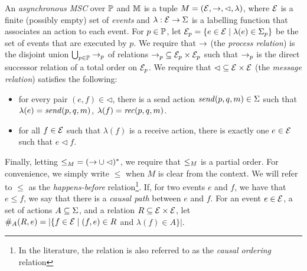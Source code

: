 \begin{definition}
An \emph{asynchronous MSC}  over $\Procs$ and $\Msg$ is a tuple $\msc = (\Events,\procrel,\lhd,\lambda)$, where $\Events$ is a finite (possibly empty) set of \emph{events} and $\lambda: \Events \to \Act$ is a labelling function that associates an action to each event. For $p \in \Procs$, let $\Events_p = \{e \in \Events \mid \lambda(e) \in \pAct{p}\}$ be the set of events that are executed by $p$. We require that $\procrel$ (the \emph{process relation}) is the disjoint union $\bigcup_{p \in \Procs} \procrel_p$ of relations ${\procrel_p} \subseteq \Events_p \times \Events_p$ such that $\procrel_p$ is the direct successor relation of a total order on $\Events_p$.  We require that ${\lhd} \subseteq \Events \times \Events$ (the \emph{message relation}) satisfies the following:
\begin{itemize}\itemsep=0.5ex
\item[(1)] for every pair $(e,f) \in {\lhd}$, there is a send action $\sact{p}{q}{\msg} \in \Act$ such that $\lambda(e) = \sact{p}{q}{\msg}$, $\lambda(f) = \ract{p}{q}{\msg}$.
\item[(2)] for all $f \in \Events$ such that $\lambda(f)$ is a receive action, there is exactly one $e \in \Events$ such that $e \lhd f$.
\end{itemize}
Finally, letting ${\le}_\msc = ({\procrel} \cup {\lhd})^\ast$,
we require that $\le_\msc$ is a partial order. For convenience, we simply write $\le$ when $M$ is clear from the context. We will refer to $\le$ as the \emph{happens-before} relation\footnote{In the literature, the relation is also referred to as the \emph{causal ordering} relation}. If, for two events $e$ and $f$, we have that $e \le f$, we   say that there is a \emph{causal path} between $e$ and $f$.
For an event $e \in \Events$, a set of actions $A \subseteq \Act$, and a relation $\rel \subseteq \Events \times \Events$,
let $\sametype{e}{A}{\rel} = |\{f \in \Events \mid (f,e) \in \rel$ and $\lambda(f) \in A\}|$.
\end{definition}

